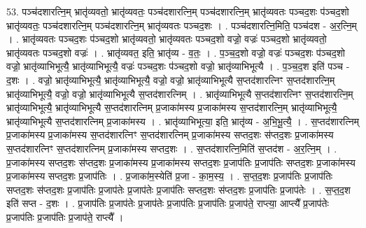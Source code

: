 \documentclass[17pt]{extarticle}
\begin{document}
53. पञ्च॑दशारत्नि॒म् भ्रातृ॑व्यवतो॒ भ्रातृ॑व्यवतः॒ पञ्च॑दशारत्नि॒म् पञ्च॑दशारत्नि॒म् भ्रातृ॑व्यवतः पञ्चद॒शः प॑ञ्चद॒शो भ्रातृ॑व्यवतः॒ पञ्च॑दशारत्नि॒म् पञ्च॑दशारत्नि॒म् भ्रातृ॑व्यवतः पञ्चद॒शः । . पञ्च॑दशारत्नि॒मिति॒ पञ्च॑दश - अ॒र॒त्नि॒म् । . भ्रातृ॑व्यवतः पञ्चद॒शः प॑ञ्चद॒शो भ्रातृ॑व्यवतो॒ भ्रातृ॑व्यवतः पञ्चद॒शो वज्रो॒ वज्रः॑ पञ्चद॒शो भ्रातृ॑व्यवतो॒ भ्रातृ॑व्यवतः पञ्चद॒शो वज्रः॑ । . भ्रातृ॑व्यवत॒ इति॒ भ्रातृ॑व्य - व॒तः॒ । . प॒ञ्च॒द॒शो वज्रो॒ वज्रः॑ पञ्चद॒शः प॑ञ्चद॒शो वज्रो॒ भ्रातृ॑व्याभिभूत्यै॒ भ्रातृ॑व्याभिभूत्यै॒ वज्रः॑ पञ्चद॒शः प॑ञ्चद॒शो वज्रो॒ भ्रातृ॑व्याभिभूत्यै । . प॒ञ्च॒द॒श इति॑ पञ्च - द॒शः । . वज्रो॒ भ्रातृ॑व्याभिभूत्यै॒ भ्रातृ॑व्याभिभूत्यै॒ वज्रो॒ वज्रो॒ भ्रातृ॑व्याभिभूत्यै स॒प्तद॑शारत्निꣳ स॒प्तद॑शारत्नि॒म् भ्रातृ॑व्याभिभूत्यै॒ वज्रो॒ वज्रो॒ भ्रातृ॑व्याभिभूत्यै स॒प्तद॑शारत्निम् । . भ्रातृ॑व्याभिभूत्यै स॒प्तद॑शारत्निꣳ स॒प्तद॑शारत्नि॒म् भ्रातृ॑व्याभिभूत्यै॒ भ्रातृ॑व्याभिभूत्यै स॒प्तद॑शारत्निम् प्र॒जाका॑मस्य प्र॒जाका॑मस्य स॒प्तद॑शारत्नि॒म् भ्रातृ॑व्याभिभूत्यै॒ भ्रातृ॑व्याभिभूत्यै स॒प्तद॑शारत्निम् प्र॒जाका॑मस्य । . भ्रातृ॑व्याभिभूत्या॒ इति॒ भ्रातृ॑व्य - अ॒भि॒भू॒त्यै॒ । . स॒प्तद॑शारत्निम् प्र॒जाका॑मस्य प्र॒जाका॑मस्य स॒प्तद॑शारत्निꣳ स॒प्तद॑शारत्निम् प्र॒जाका॑मस्य सप्तद॒शः स॑प्तद॒शः प्र॒जाका॑मस्य स॒प्तद॑शारत्निꣳ स॒प्तद॑शारत्निम् प्र॒जाका॑मस्य सप्तद॒शः । . स॒प्तद॑शारत्नि॒मिति॑ स॒प्तद॑श - अ॒र॒त्नि॒म् । . प्र॒जाका॑मस्य सप्तद॒शः स॑प्तद॒शः प्र॒जाका॑मस्य प्र॒जाका॑मस्य सप्तद॒शः प्र॒जाप॑तिः प्र॒जाप॑तिः सप्तद॒शः प्र॒जाका॑मस्य प्र॒जाका॑मस्य सप्तद॒शः प्र॒जाप॑तिः । . प्र॒जाका॑म॒स्येति॑ प्र॒जा - का॒म॒स्य॒ । . स॒प्त॒द॒शः प्र॒जाप॑तिः प्र॒जाप॑तिः सप्तद॒शः स॑प्तद॒शः प्र॒जाप॑तिः प्र॒जाप॑तेः प्र॒जाप॑तेः प्र॒जाप॑तिः सप्तद॒शः स॑प्तद॒शः प्र॒जाप॑तिः प्र॒जाप॑तेः । . स॒प्त॒द॒श इति॑ सप्त - द॒शः । . प्र॒जाप॑तिः प्र॒जाप॑तेः प्र॒जाप॑तेः प्र॒जाप॑तिः प्र॒जाप॑तिः प्र॒जाप॑ते॒ राप्त्या॒ आप्त्यै᳚ प्र॒जाप॑तेः प्र॒जाप॑तिः प्र॒जाप॑तिः प्र॒जाप॑ते॒ राप्त्यै᳚ । \newline
\end{document}
